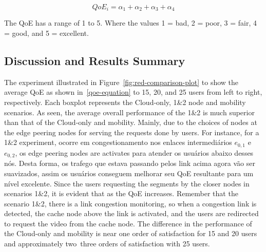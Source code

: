 \begin{equation}\label{eq:qoe-equation}
QoE_i = \alpha_1 + \alpha_2 + \alpha_3 + \alpha_4
\end{equation}

The QoE has a range of 1 to 5. Where the values 1 = bad, 2 = poor, 3 = fair, 4 = good, and 5 = excellent.



\subsection{Discussion and Results Summary}


The experiment illustrated in Figure~\ref{fig:red-comparison-plot} to show the average QoE as shown in~\ref{qoe-equation} to 15, 20, and 25 users from left to right, respectively. Each boxplot represents the Cloud-only, 1\&2 node and mobility scenarios. As seen, the average overall performance of the 1\&2 is much superior than that of the Cloud-only and mobility. Mainly, due to the choices of nodes at the edge peering nodes for serving the requests done by users. 
%
For instance, for a 1\&2 experiment, ocorre em congestionamento nos enlaces intermediários $e_{0,1}$ e $e_{0,2}$, os edge peering nodes are activates para atender os usuários abaixo desses nós. Desta forma, os trafego que estava passando pelos link acima agora vão ser suavizados, assim os usuários conseguem melhorar seu QoE resultante para um nível excelente.    
%
Since the users requesting the segments by the closer nodes in scenarios 1\&2, it is
evident that as the QoE increases. Remember that the scenario 1\&2, there is a link congestion monitoring, so when a congestion link is detected, the cache node above the link is activated, and the users are redirected to request the video from the cache node.
%
The difference in the performance of the Cloud-only and mobility is near one order of satisfaction for 15 and 20 users and approximately two~three orders of satisfaction with 25 users. 


